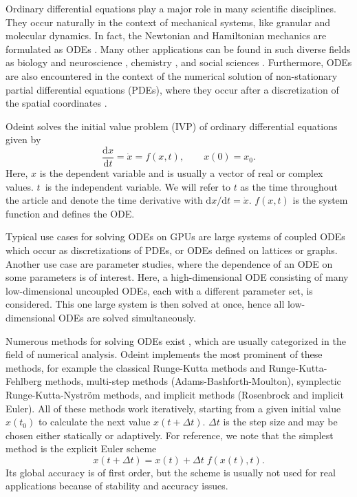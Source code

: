 \documentclass[final]{siamltex}
\newcommand {\de} {\mbox{d}}
\begin{document}
Ordinary differential equations play a major role in many scientific
disciplines. They occur naturally in the context of mechanical systems, like
granular \cite{poschel_computational_2005} and molecular dynamics. In fact, the  %
Newtonian and Hamiltonian mechanics are formulated as ODEs
\cite{landau_mechanics_1976}.  Many other applications can be found in such
diverse fields as biology \cite{brauer_mathematical_2001,Murray-93} and
neuroscience \cite{izhikevich_dynamical_2006}, chemistry
\cite{atkins_physical_2001}, and social sciences \cite{Helbing01}. Furthermore,
ODEs are also encountered in the context of the numerical solution of
non-stationary partial differential equations (PDEs), where they occur after
a discretization of the spatial coordinates \cite{Hundsdorfer2003}.

Odeint solves the initial value problem (IVP) of ordinary differential
equations given by
\begin{equation}
\frac{\de x}{\de t } = \dot{x} = f(x , t), \quad \quad x(0) = x_0.
\label{eq:ode}
\end{equation}
Here, $x$ is the dependent variable and is usually a vector of real or complex
values.  $t$~is the independent variable. We will refer to $t$ as the time
throughout the article and denote the time derivative with $\de x / \de t =
\dot{x}$. $f(x,t)$ is the system function and defines the ODE.

Typical use cases for solving ODEs on GPUs are large systems of coupled ODEs
which occur as discretizations of PDEs, or ODEs defined on lattices or
graphs. Another use case are parameter studies, where the
dependence of an ODE on some parameters is of interest. Here, a high-dimensional ODE consisting of many low-dimensional
uncoupled ODEs, each with a different parameter set, is
considered. This one large system is then solved at once, hence all
low-dimensional ODEs are solved simultaneously.



Numerous methods for solving ODEs exist \cite{HairerSolvingODEI,
HairerSolvingODEII,Press-92}, which are usually categorized in the field of numerical
analysis.  Odeint implements the most prominent of these methods, for example
the classical Runge-Kutta methods and Runge-Kutta-Fehlberg methods, multi-step
methods (Adams-Bashforth-Moulton), symplectic Runge-Kutta-Nystr\"om methods,
and implicit methods (Rosenbrock and implicit Euler). All of these methods work
iteratively, starting from a given initial value $x(t_0)$ to calculate the next
value $x(t+\Delta t)$.  $\Delta t$ is the step size and may be chosen either
statically or adaptively.  For reference, we note that the simplest method is
the explicit Euler scheme
\begin{equation}
x\left(t+\Delta t\right) = x(t) + \Delta t \; f(x(t),t) .
\label{eq:euler}
\end{equation}
Its global accuracy is of first order, but the scheme is usually not
used for real applications because of stability and accuracy issues.
\end{document}
